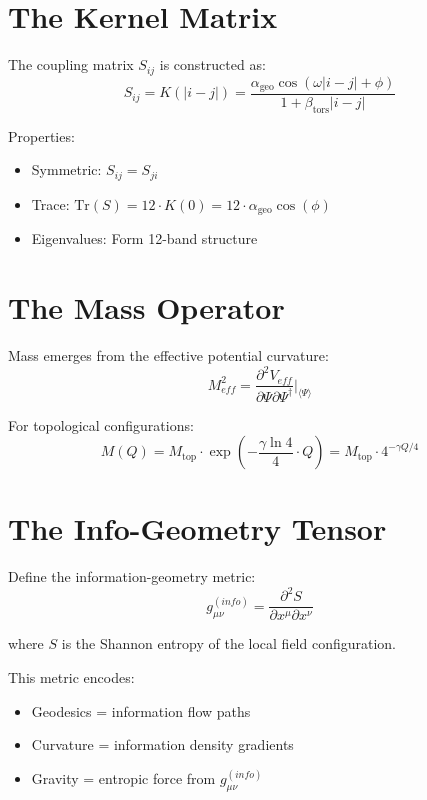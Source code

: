 \documentclass[11pt,a4paper]{book}
\theoremstyle{remark}
\newcommand{\alphageo}{\alpha_{\text{geo}}}
\newcommand{\betators}{\beta_{\text{tors}}}
\newcommand{\Mtop}{M_{\text{top}}}
\begin{document}
\section{The Kernel Matrix}

The coupling matrix $S_{ij}$ is constructed as:
\begin{equation}
S_{ij} = K(|i - j|) = \frac{\alphageo \cos(\omega |i-j| + \phi)}{1 + \betators |i-j|}
\end{equation}

Properties:
\begin{itemize}
    \item Symmetric: $S_{ij} = S_{ji}$
    \item Trace: $\text{Tr}(S) = 12 \cdot K(0) = 12 \cdot \alphageo \cos(\phi)$
    \item Eigenvalues: Form 12-band structure
\end{itemize}

\section{The Mass Operator}

Mass emerges from the effective potential curvature:
\begin{equation}
M^2_{eff} = \frac{\partial^2 V_{eff}}{\partial \Psi \partial \Psi^\dagger}\bigg|_{\langle\Psi\rangle}
\end{equation}

For topological configurations:
\begin{equation}
M(Q) = \Mtop \cdot \exp\left(-\frac{\gamma \ln 4}{4} \cdot Q\right) = \Mtop \cdot 4^{-\gamma Q/4}
\end{equation}

\section{The Info-Geometry Tensor}

Define the information-geometry metric:
\begin{equation}
g_{\mu\nu}^{(info)} = \frac{\partial^2 S}{\partial x^\mu \partial x^\nu}
\end{equation}

where $S$ is the Shannon entropy of the local field configuration.

This metric encodes:
\begin{itemize}
    \item Geodesics = information flow paths
    \item Curvature = information density gradients
    \item Gravity = entropic force from $g_{\mu\nu}^{(info)}$
\end{itemize}
\end{document}
